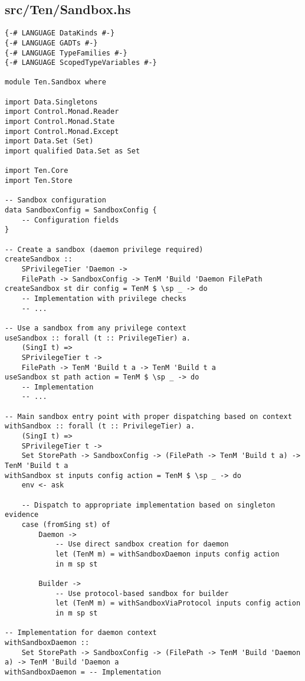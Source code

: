 \documentclass{article}
\begin{document}
\subsection{src/Ten/Sandbox.hs}

\begin{tcolorbox}[title=Ten/Sandbox.hs Changes]
\begin{verbatim}
{-# LANGUAGE DataKinds #-}
{-# LANGUAGE GADTs #-}
{-# LANGUAGE TypeFamilies #-}
{-# LANGUAGE ScopedTypeVariables #-}

module Ten.Sandbox where

import Data.Singletons
import Control.Monad.Reader
import Control.Monad.State
import Control.Monad.Except
import Data.Set (Set)
import qualified Data.Set as Set

import Ten.Core
import Ten.Store

-- Sandbox configuration
data SandboxConfig = SandboxConfig {
    -- Configuration fields
}

-- Create a sandbox (daemon privilege required)
createSandbox ::
    SPrivilegeTier 'Daemon ->
    FilePath -> SandboxConfig -> TenM 'Build 'Daemon FilePath
createSandbox st dir config = TenM $ \sp _ -> do
    -- Implementation with privilege checks
    -- ...

-- Use a sandbox from any privilege context
useSandbox :: forall (t :: PrivilegeTier) a.
    (SingI t) =>
    SPrivilegeTier t ->
    FilePath -> TenM 'Build t a -> TenM 'Build t a
useSandbox st path action = TenM $ \sp _ -> do
    -- Implementation
    -- ...

-- Main sandbox entry point with proper dispatching based on context
withSandbox :: forall (t :: PrivilegeTier) a.
    (SingI t) =>
    SPrivilegeTier t ->
    Set StorePath -> SandboxConfig -> (FilePath -> TenM 'Build t a) -> TenM 'Build t a
withSandbox st inputs config action = TenM $ \sp _ -> do
    env <- ask

    -- Dispatch to appropriate implementation based on singleton evidence
    case (fromSing st) of
        Daemon ->
            -- Use direct sandbox creation for daemon
            let (TenM m) = withSandboxDaemon inputs config action
            in m sp st

        Builder ->
            -- Use protocol-based sandbox for builder
            let (TenM m) = withSandboxViaProtocol inputs config action
            in m sp st

-- Implementation for daemon context
withSandboxDaemon ::
    Set StorePath -> SandboxConfig -> (FilePath -> TenM 'Build 'Daemon a) -> TenM 'Build 'Daemon a
withSandboxDaemon = -- Implementation


\end{verbatim}
\end{tcolorbox}
\end{document}

